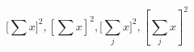 \documentclass{book}
\begin{document}
\begin{equation*}
\bigg[\sum x \bigg]^{2},
\left[\sum x \right]^{2},
\bigg[\sum_j x \bigg]^{2},
\left[\sum_j x \right]^{2}
\end{equation*}
\end{document}

